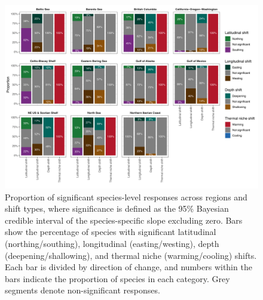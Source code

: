 \documentclass[11pt]{article}
\begin{document}
\begin{figure}[h]
    \centering
    \includegraphics[scale=.65]{images/prop_sign.png}
    \caption{Proportion of significant species-level responses across regions and shift types, where significance is defined as the 95\% Bayesian credible interval of the species-specific slope excluding zero. 
Bars show the percentage of species with significant latitudinal (northing/southing), longitudinal (easting/westing), depth (deepening/shallowing), and thermal niche (warming/cooling) shifts. 
Each bar is divided by direction of change, and numbers within the bars indicate the proportion of species in each category. 
Grey segments denote non-significant responses.}
    \label{fig:prop_sign}
\end{figure}


\newpage
\end{document}
